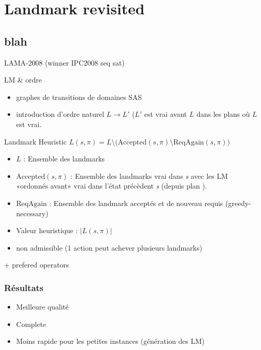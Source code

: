\section{Landmark revisited}
  \subsection*{blah}

\begin{frame}
  
  \begin{block}{}
    LAMA-2008 (winner IPC2008 seq sat)
    
  \end{block}

  \begin{block}{LM \& ordre}
    \begin{itemize}
      \item graphes de transitions de domaines SAS\up{+}
      \item introduction d'ordre naturel $L → L'$ ($L'$ est vrai avant $L$ dans les plans où $L$ est vrai.
    \end{itemize}

  \end{block}
\end{frame}

\begin{frame}
  \begin{block}{Landmark Heuristic}
    $L(s, \pi) = L \setminus \big(\text{Accepted}(s, \pi) \setminus \text{ReqAgain}(s, \pi)\big)$
    \begin{itemize}
      \item $L$ : Ensemble des landmarks
      \item $\text{Accepted}(s, \pi)$ : Ensemble des landmarks vrai dans \emph{s} avec les LM «ordonnés avant» vrai dans l'état précèdent \emph{s} (depuis plan \pi).
      \item $\text{ReqAgain}$ : Ensemble des landmark acceptés et de nouveau requis (greedy-necessary)
      \item Valeur heuristique : $|L(s, \pi)|$
      \item \alert{non admissible} (1 action peut achever plusieurs landmarks)
    \end{itemize}

    + prefered operators
  \end{block}
\end{frame}

\begin{frame}
  \frametitle{Résultats}

  \begin{block}{}
    \begin{itemize}
      \item Meilleure qualité
      \item Complete
      \item Moins rapide pour les petites instances (génération des LM)
    \end{itemize}
  \end{block}
\end{frame}
